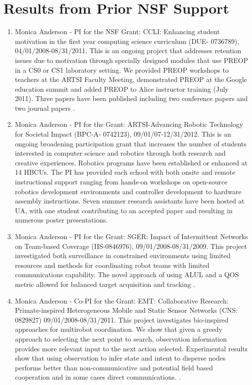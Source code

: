 
\section{Results from Prior NSF Support}\label{sec:prior-nsf}
\begin{enumerate}
\item Monica Anderson  - PI for the NSF Grant: CCLI: Enhancing student motivation in the first year computing science curriculum (DUE- 0736789), 04/01/2008-08/31/2011.  This is an ongoing project that addresses retention issues due to motivation through specially designed modules that use PREOP in a CS0 or CS1 laboratory setting.  We provided PREOP workshops to teachers at the ARTSI Faculty Meeting, demonstrated PREOP at the Google education summit and added PREOP to Alice instructor training (July 2011). Three papers have been published including two conference papers and two journal papers \cite{Davis2009,wellman2009alice,Wellman2009b,Anderson}. 
\item Monica Anderson  - PI for the Grant: ARTSI-Advancing Robotic Technology for Societal Impact (BPC-A- 0742123), 09/01/07-12/31/2012. This is an ongoing broadening participation grant that increases the number of students interested in computer science and robotics through both research and creative experiences. Robotics programs have been established or enhanced at 14 HBCUs. The PI has provided each school with both onsite and remote instructional support ranging from hands-on workshops on open-source robotics development environments and controller development to hardware assembly instructions. Seven summer research assistants have been hosted at UA, with one student contributing to an accepted paper \cite{Wellman2009} and resulting in numerous poster presentations. 
\item Monica Anderson  - PI for the Grant: SGER: Impact of Intermittent Networks on Team-based Coverage (IIS-0846976), 09/01/2008-08/31/2009. This project investigated both surveillance in constrained environments using limited resources and methods for coordinating robot teams with limited communications capability. The novel approach of using ALUL and a QOS metric allowed for balanced target acquisition and tracking \cite{Veluchamy2010,Alexander2009,Mckenzie2010,McKenzie2009}.
\item Monica Anderson  - Co-PI for the Grant: EMT: Collaborative Research: Primate-inspired Heterogeneous Mobile and Static Sensor Networks (CNS: 0829827) 09/01/2008-08/31/2011. This project investigates bio-inspired approaches for multirobot coordination. We show that given a greedy approach to selecting the next point to search, observation information provides more relevant input to the next action selected. Experimental results show that using observation to infer state and intent to disperse nodes performs better than non-communicative and potential field based cooperation and in some cases direct communications. \cite{Wellman2009d,Dawson2011,Dawson2010,Dawson2011b,Wellman2009c}. 

\end{enumerate}
